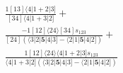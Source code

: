 \documentclass[varwidth, border=5pt]{standalone}
\begin{document}
\begin{my}
$\begin{gathered}
\scriptscriptstyle\frac{1[13]⟨4|1+2|3]}{[34]⟨4|1+3|2]} +\\
\scriptscriptstyle\frac{-1[12]⟨24⟩[34]s_{123}}{[24](⟨3|2|𝟓|4|3]-⟨2|1|𝟓|4|2])} +\\
\scriptscriptstyle\frac{1[12]⟨24⟩⟨4|1+2|3]s_{123}}{⟨4|1+3|2](⟨3|2|𝟓|4|3]-⟨2|1|𝟓|4|2])} \phantom{+}
\end{gathered}$
\end{my}
\end{document}
